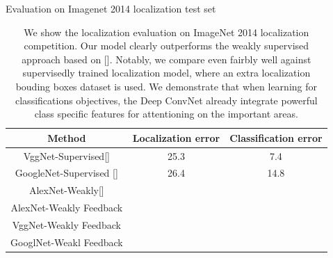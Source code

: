 \begin{table}
\centering
Evaluation on Imagenet 2014 localization test set
\begin{tabular}{|c|c|c|}
\hline
Method & Localization error & Classification error\\
\hline
VggNet-Supervised[] & 25.3 & 7.4 \\
GoogleNet-Supervised [] & 26.4 & 14.8 \\
AlexNet-Weakly[] & & \\
AlexNet-Weakly Feedback & & \\
VggNet-Weakly Feedback & & \\
GooglNet-Weakl Feedback & & \\
\hline
\end{tabular}
\caption{We show the localization evaluation on ImageNet 2014 localization competition. Our model clearly outperforms the weakly supervised approach based on []. Notably, we compare even fairbly well against supervisedly trained localization model, where an extra localization bouding boxes dataset is used. We demonstrate that when learning for classifications objectives, the Deep ConvNet already integrate powerful class specific features for attentioning on the important areas.}
\label{tab:localization_accuracy}
\end{table}

